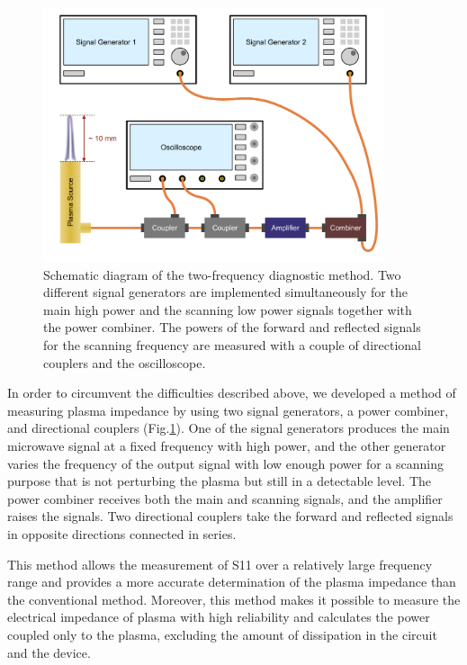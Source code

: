 \begin{figure}[h!]
\centering
\includegraphics[width=100mm]{figures/ap7/twoFreq/twoFreq.pdf}
\caption{Schematic diagram of the two-frequency diagnostic method. Two different signal generators are implemented simultaneously for the main high power and the scanning low power signals together with the power combiner. The powers of the forward and reflected signals for the scanning frequency are measured with a couple of directional couplers and the oscilloscope.}
\label{fig:twoFreq}
\end{figure}

In order to circumvent the difficulties described above, we developed a method of measuring plasma impedance by using two signal generators, a power combiner, and directional couplers (Fig.\ref{fig:twoFreq}).  One of the signal generators produces the main microwave signal at a fixed frequency with high power, and the other generator varies the frequency of the output signal with low enough power for a scanning purpose that is not perturbing the plasma but still in a detectable level. The power combiner receives both the main and scanning signals, and the amplifier raises the signals. Two directional couplers take the forward and reflected signals in opposite directions connected in series.

This method allows the measurement of S11 over a relatively large frequency range and provides a more accurate determination of the plasma impedance than the conventional method. Moreover, this method makes it possible to measure the electrical impedance of plasma with high reliability and calculates the power coupled only to the plasma, excluding the amount of dissipation in the circuit and the device. 


